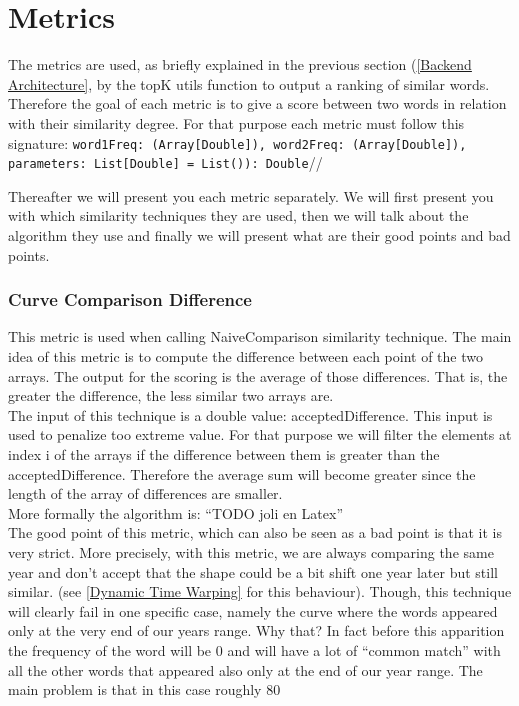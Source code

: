 \documentclass{article}
\begin{document}
\section{Metrics}

The metrics are used, as briefly explained in the previous section (\ref{Backend Architecture}, by the topK utils function to output a ranking of similar words. Therefore the goal of each metric is to give a score between two words in relation with their similarity degree. For that purpose each metric must follow this signature: \texttt{word1Freq: (Array[Double]), word2Freq: (Array[Double]), parameters: List[Double] = List()): Double}//

Thereafter we will present you each metric separately. We will first present you with which similarity techniques they are used, then we will talk about the algorithm they use and finally we will present what are their good points and bad points.


\subsubsection{Curve Comparison Difference}

This metric is used when calling NaiveComparison similarity technique. The main idea of this metric is to compute the difference between each point of the two arrays. The output for the scoring is the average of those differences. That is, the greater the difference, the less similar two arrays are. \\

The input of this technique is a double value: acceptedDifference. This input is used to penalize too extreme value. For that purpose we will filter the elements at index i of the arrays if the difference between them is greater than the acceptedDifference. Therefore the average sum will become greater since the length of the array of differences are smaller.\\

More formally the algorithm is: “TODO joli en Latex”\\

The good point of this metric, which can also be seen as a bad point is that it is very strict. More precisely, with this metric, we are always comparing the same year and don’t accept that the shape could be a bit shift one year later but still similar. (see \ref{Dynamic Time Warping} for this behaviour). Though, this technique will clearly fail in one specific case, namely the curve where the words appeared only at the very end of our years range. Why that? In fact before this apparition the frequency of the word will be 0 and will have a lot of “common match” with all the other words that appeared also only at the end of our year range. The main problem is that in this case roughly 80%
\end{document}
